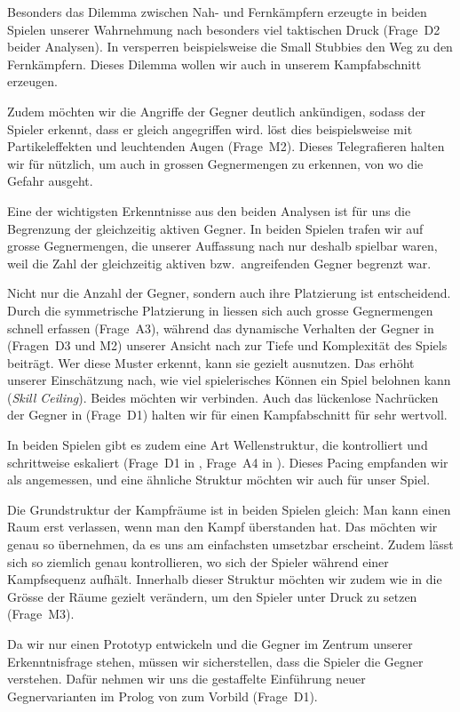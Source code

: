 \documentclass[../Main.tex]{subfiles}
\begin{document}
Besonders das Dilemma zwischen Nah- und Fernkämpfern erzeugte in beiden Spielen unserer Wahrnehmung nach besonders viel taktischen Druck (Frage~D2 beider Analysen). In  versperren beispielsweise die Small Stubbies den Weg zu den Fernkämpfern. Dieses Dilemma wollen wir auch in unserem Kampfabschnitt erzeugen.

Zudem möchten wir die Angriffe der Gegner deutlich ankündigen, sodass der Spieler erkennt, dass er gleich angegriffen wird.  löst dies beispielsweise mit Partikeleffekten und leuchtenden Augen (Frage~M2). Dieses Telegrafieren halten wir für nützlich, um auch in grossen Gegnermengen zu erkennen, von wo die Gefahr ausgeht.

Eine der wichtigsten Erkenntnisse aus den beiden Analysen ist für uns die Begrenzung der gleichzeitig aktiven Gegner. In beiden Spielen trafen wir auf grosse Gegnermengen, die unserer Auffassung nach nur deshalb spielbar waren, weil die Zahl der gleichzeitig aktiven bzw.\ angreifenden Gegner begrenzt war.

Nicht nur die Anzahl der Gegner, sondern auch ihre Platzierung ist entscheidend. Durch die symmetrische Platzierung in  liessen sich auch grosse Gegnermengen schnell erfassen (Frage~A3), während das dynamische Verhalten der Gegner in  (Fragen~D3 und M2) unserer Ansicht nach zur Tiefe und Komplexität des Spiels beiträgt. Wer diese Muster erkennt, kann sie gezielt ausnutzen. Das erhöht unserer Einschätzung nach, wie viel spielerisches Können ein Spiel belohnen kann (\textit{Skill Ceiling}). Beides möchten wir verbinden. Auch das lückenlose Nachrücken der Gegner in  (Frage~D1) halten wir für einen Kampfabschnitt für sehr wertvoll.

In beiden Spielen gibt es zudem eine Art Wellenstruktur, die kontrolliert und schrittweise eskaliert (Frage~D1 in , Frage~A4 in ). Dieses Pacing empfanden wir als angemessen, und eine ähnliche Struktur möchten wir auch für unser Spiel.

Die Grundstruktur der Kampfräume ist in beiden Spielen gleich: Man kann einen Raum erst verlassen, wenn man den Kampf überstanden hat. Das möchten wir genau so übernehmen, da es uns am einfachsten umsetzbar erscheint. Zudem lässt sich so ziemlich genau kontrollieren, wo sich der Spieler während einer Kampfsequenz aufhält. Innerhalb dieser Struktur möchten wir zudem wie in  die Grösse der Räume gezielt verändern, um den Spieler unter Druck zu setzen (Frage~M3).

Da wir nur einen Prototyp entwickeln und die Gegner im Zentrum unserer Erkenntnisfrage stehen, müssen wir sicherstellen, dass die Spieler die Gegner verstehen. Dafür nehmen wir uns die gestaffelte Einführung neuer Gegnervarianten im Prolog von  zum Vorbild (Frage~D1).
\end{document}
